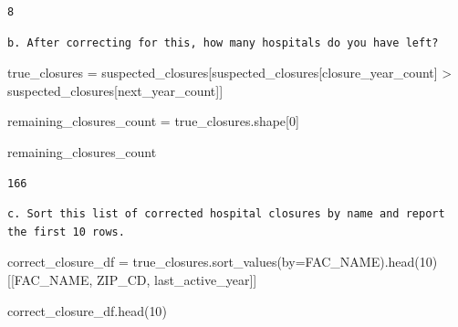 \documentclass[
  letterpaper,
  DIV=11,
  numbers=noendperiod]{scrartcl}
\newenvironment{Shaded}{\begin{snugshade}}{\end{snugshade}}
\newcommand{\DecValTok}[1]{\textcolor[rgb]{0.68,0.00,0.00}{#1}}
\newcommand{\NormalTok}[1]{\textcolor[rgb]{0.00,0.23,0.31}{#1}}
\newcommand{\OperatorTok}[1]{\textcolor[rgb]{0.37,0.37,0.37}{#1}}
\newcommand{\StringTok}[1]{\textcolor[rgb]{0.13,0.47,0.30}{#1}}
\begin{document}
\begin{verbatim}
8
\end{verbatim}

\begin{verbatim}
b. After correcting for this, how many hospitals do you have left?
\end{verbatim}

\begin{Shaded}
\begin{Highlighting}[]
\NormalTok{true\_closures }\OperatorTok{=}\NormalTok{ suspected\_closures[suspected\_closures[}\StringTok{\textquotesingle{}closure\_year\_count\textquotesingle{}}\NormalTok{] }\OperatorTok{\textgreater{}}\NormalTok{ suspected\_closures[}\StringTok{\textquotesingle{}next\_year\_count\textquotesingle{}}\NormalTok{]]}

\NormalTok{remaining\_closures\_count }\OperatorTok{=}\NormalTok{ true\_closures.shape[}\DecValTok{0}\NormalTok{]}

\NormalTok{remaining\_closures\_count}
\end{Highlighting}
\end{Shaded}

\begin{verbatim}
166
\end{verbatim}

\begin{verbatim}
c. Sort this list of corrected hospital closures by name and report the first 10 rows.
\end{verbatim}

\begin{Shaded}
\begin{Highlighting}[]
\NormalTok{correct\_closure\_df }\OperatorTok{=}\NormalTok{ true\_closures.sort\_values(by}\OperatorTok{=}\StringTok{\textquotesingle{}FAC\_NAME\textquotesingle{}}\NormalTok{).head(}\DecValTok{10}\NormalTok{)[[}\StringTok{\textquotesingle{}FAC\_NAME\textquotesingle{}}\NormalTok{, }\StringTok{\textquotesingle{}ZIP\_CD\textquotesingle{}}\NormalTok{, }\StringTok{\textquotesingle{}last\_active\_year\textquotesingle{}}\NormalTok{]]}

\NormalTok{correct\_closure\_df.head(}\DecValTok{10}\NormalTok{)}
\end{Highlighting}
\end{Shaded}
\end{document}
